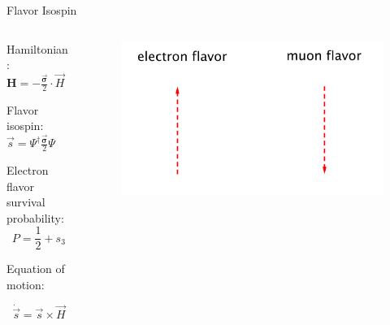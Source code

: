 \begin{frame}{Flavor Isospin}








\begin{columns}[T]
\begin{column}{0.5\textwidth}


Hamiltonian: $\mathbf H = - \frac{\vec{\boldsymbol{\sigma}} }{2}\cdot \vec H$


Flavor isospin: $\vec s = \Psi^{\dagger} \frac{\vec{\boldsymbol{\sigma}} }{2} \Psi $

\small
Electron flavor survival probability:
\vspace*{0pt}
\begin{equation*}
P = \frac{1}{2} + s_3
\end{equation*}


Equation of motion:

\begin{equation*}
\dot{\vec s} = \vec s \times \vec H
\end{equation*}




\end{column}%
\begin{column}{0.5\textwidth}

\begin{figure}
\centering
\includegraphics[width=\textwidth]{assets/flavor-isospin-illus}
\end{figure}

\end{column}
\end{columns}


\end{frame}
